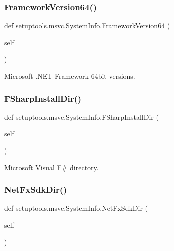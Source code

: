 \subsubsection{\texorpdfstring{Framework\+Version64()}{FrameworkVersion64()}}
{\footnotesize\ttfamily def setuptools.\+msvc.\+System\+Info.\+Framework\+Version64 (\begin{DoxyParamCaption}\item[{}]{self }\end{DoxyParamCaption})}

\begin{DoxyVerb}Microsoft .NET Framework 64bit versions.
\end{DoxyVerb}
 \mbox{\label{classsetuptools_1_1msvc_1_1_system_info_a9a5c0f4de906f3fcb09d6e2ca3f37d43}} 
\subsubsection{\texorpdfstring{F\+Sharp\+Install\+Dir()}{FSharpInstallDir()}}
{\footnotesize\ttfamily def setuptools.\+msvc.\+System\+Info.\+F\+Sharp\+Install\+Dir (\begin{DoxyParamCaption}\item[{}]{self }\end{DoxyParamCaption})}

\begin{DoxyVerb}Microsoft Visual F# directory.
\end{DoxyVerb}
 \mbox{\label{classsetuptools_1_1msvc_1_1_system_info_ad0fbcce4995153fab005f15910fb30a6}} 
\subsubsection{\texorpdfstring{Net\+Fx\+Sdk\+Dir()}{NetFxSdkDir()}}
{\footnotesize\ttfamily def setuptools.\+msvc.\+System\+Info.\+Net\+Fx\+Sdk\+Dir (\begin{DoxyParamCaption}\item[{}]{self }\end{DoxyParamCaption})}

